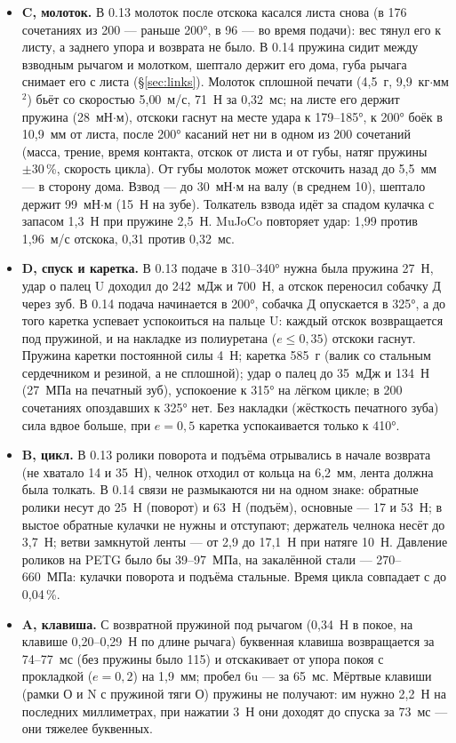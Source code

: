 \begin{itemize}
  \item \textbf{C, молоток.} В 0.13 молоток после отскока касался листа снова (в 176 сочетаниях из 200 — раньше 200°, в 96 — во время подачи): вес тянул его к листу, а заднего упора и возврата не было. В 0.14 пружина сидит между взводным рычагом и молотком, шептало держит его дома, губа рычага снимает его с листа (\S\ref{sec:links}). Молоток сплошной печати (4{,}5~г, 9{,}9~кг$\cdot$мм$^2$) бьёт со скоростью 5{,}00~м/с, 71~Н за 0{,}32~мс; на листе его держит пружина (28~мН$\cdot$м), отскоки гаснут на месте удара к 179--185°, к 200° боёк в 10,9~мм от листа, после 200° касаний нет ни в одном из 200 сочетаний (масса, трение, время контакта, отскок от листа и от губы, натяг пружины $\pm30$\,\%, скорость цикла). От губы молоток может отскочить назад до 5,5~мм — в сторону дома. Взвод — до 30~мН$\cdot$м на валу (в среднем 10), шептало держит 99~мН$\cdot$м (15~Н на зубе). Толкатель взвода идёт за спадом кулачка с запасом 1,3~Н при пружине 2,5~Н. MuJoCo повторяет удар: 1{,}99 против 1{,}96~м/с отскока, 0{,}31 против 0{,}32~мс.
  \item \textbf{D, спуск и каретка.} В 0.13 подаче в 310--340° нужна была пружина 27~Н, удар о палец U доходил до 242~мДж и 700~Н, а отскок переносил собачку Д через зуб. В 0.14 подача начинается в 200°, собачка Д опускается в 325°, а до того каретка успевает успокоиться на пальце U: каждый отскок возвращается под пружиной, и на накладке из полиуретана ($e \le 0{,}35$) отскоки гаснут. Пружина каретки постоянной силы 4~Н; каретка 585~г (валик со стальным сердечником и резиной, а не сплошной); удар о палец до 35~мДж и 134~Н (27~МПа на печатный зуб), успокоение к 315° на лёгком цикле; в 200 сочетаниях опоздавших к 325° нет. Без накладки (жёсткость печатного зуба) сила вдвое больше, при $e = 0{,}5$ каретка успокаивается только к 410°.
  \item \textbf{B, цикл.} В 0.13 ролики поворота и подъёма отрывались в начале возврата (не хватало 14 и 35~Н), челнок отходил от кольца на 6,2~мм, лента должна была толкать. В 0.14 связи не размыкаются ни на одном знаке: обратные ролики несут до 25~Н (поворот) и 63~Н (подъём), основные — 17 и 53~Н; в выстое обратные кулачки не нужны и отступают; держатель челнока несёт до 3,7~Н; ветви замкнутой ленты — от 2,9 до 17,1~Н при натяге 10~Н. Давление роликов на PETG было бы 39--97~МПа, на закалённой стали — 270--660~МПа: кулачки поворота и подъёма стальные. Время цикла совпадает с  до 0,04\,\%.
  \item \textbf{A, клавиша.} С возвратной пружиной под рычагом (0,34~Н в покое, на клавише 0,20--0,29~Н по длине рычага) буквенная клавиша возвращается за 74--77~мс (без пружины было 115) и отскакивает от упора покоя с прокладкой ($e = 0{,}2$) на 1,9~мм; пробел 6u — за 65~мс. Мёртвые клавиши (рамки О и N с пружиной тяги О) пружины не получают: им нужно 2,2~Н на последних миллиметрах, при нажатии 3~Н они доходят до спуска за 73~мс — они тяжелее буквенных.

\end{itemize}

